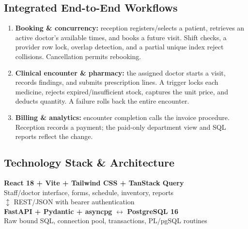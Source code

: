 \documentclass[10pt,a4paper]{article}
\begin{document}
\subsection{Integrated End-to-End Workflows}
\begin{enumerate}
\item \textbf{Booking \& concurrency:} reception registers/selects a patient, retrieves an active doctor's available times, and books a future visit. Shift checks, a provider row lock, overlap detection, and a partial unique index reject collisions. Cancellation permits rebooking.
\item \textbf{Clinical encounter \& pharmacy:} the assigned doctor starts a visit, records findings, and submits prescription lines. A trigger locks each medicine, rejects expired/insufficient stock, captures the unit price, and deducts quantity. A failure rolls back the entire encounter.
\item \textbf{Billing \& analytics:} encounter completion calls the invoice procedure. Reception records a payment; the paid-only department view and SQL reports reflect the change.
\end{enumerate}

\subsection{Technology Stack \& Architecture}
\begin{center}
\colorbox{pale}{\parbox{.94\linewidth}{\centering\vspace{5pt}
\textbf{React 18 + Vite + Tailwind CSS + TanStack Query}\\[-1pt]
\small Staff/doctor interface, forms, schedule, inventory, reports\\
$\updownarrow$ REST/JSON with bearer authentication\\
\textbf{FastAPI + Pydantic + asyncpg} $\longleftrightarrow$ \textbf{PostgreSQL 16}\\
Raw bound SQL, connection pool, transactions, PL/pgSQL routines\vspace{5pt}}}
\end{center}

\newpage
\end{document}
